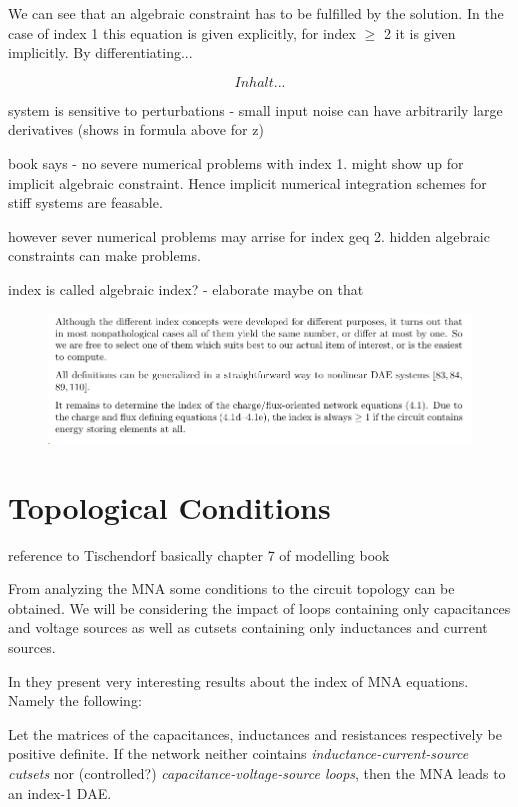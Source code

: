 We can see that an algebraic constraint has to be fulfilled by the solution. In the case of index 1 this equation is given explicitly, for index $\geq$ 2 it is given implicitly. By differentiating...

\begin{displaymath}
	Inhalt...
\end{displaymath}


system is sensitive to perturbations - small input noise can have arbitrarily large derivatives (shows in formula above for z)

book says - no severe numerical problems with index 1. might show up for implicit algebraic constraint.  Hence implicit numerical integration schemes for stiff systems are feasable.

however sever numerical problems may arrise for index geq 2. hidden algebraic constraints can make problems.

index is called algebraic index? - elaborate maybe on that



\begin{figure}[H]
	\centering
	\includegraphics[width=0.7\linewidth]{screenshot022}
	\caption{}
	\label{fig:screenshot022}
\end{figure}


\section{Topological Conditions} 
reference to Tischendorf
basically chapter 7 of modelling book

From analyzing the MNA some conditions to the circuit topology can be obtained. We will be considering the impact of loops containing only capacitances and voltage sources as well as cutsets containing only inductances and current sources.

In \cite{Tischendorf2005Topological} they present very interesting results about the index of MNA equations. Namely the following:


\begin{theorem} \cite{Tischendorf2004Topological}
	Let the matrices of the capacitances, inductances and resistances respectively be positive definite. If the network neither cointains \emph{inductance-current-source cutsets} nor (controlled?) \emph{capacitance-voltage-source loops}, then the MNA leads to an index-1 DAE.
\end{theorem}

